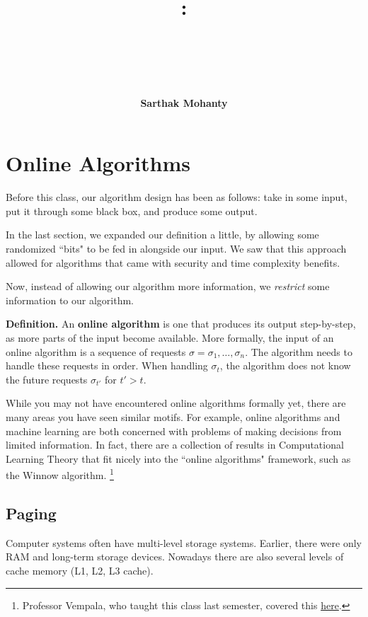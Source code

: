 \documentclass[14pt]{extreport}
\title{
    \vspace{1.75in}
    \textbf{\lectClass:\\ \lectTitle}\\
    \vspace{0.1in}\large{\textit{\lectClassInstructor\ \lectSection}}
    \vspace{2in}
\author{\textbf{Sarthak Mohanty}}
    \date{}
}
\begin{document}
\maketitle
\pagebreak

\chapter*{Online Algorithms}
    Before this class, our algorithm design has been as follows: take in some input, put it through some black box, and produce some output.

    \vspace{2mm}
    In the last section, we expanded our definition a little, by allowing some randomized ``bits" to be fed in alongside our input. We saw that this approach allowed for algorithms that came with security and time complexity benefits.

    \vspace{2mm}
    Now, instead of allowing our algorithm more information, we \textit{restrict} some information to our algorithm.
    
    \begin{tcolorbox}[colframe=gray!50, sharp corners]
        \textbf{Definition. } An \textbf{online algorithm} is one that produces its output step-by-step, as more parts of the input become available. More formally, the input of an online algorithm is a sequence of requests $\sigma = \sigma_{1}, \dots, \sigma_{n}$. The algorithm needs to handle these requests in order. When handling $\sigma_{t}$, the algorithm does not know the future requests $\sigma_{t'}$ for $t' > t$.
    \end{tcolorbox}

    \vspace{2mm}
    While you may not have encountered online algorithms formally yet, there are many areas you have seen similar motifs. For example, online algorithms and machine learning are both concerned with problems of making decisions from limited information. In fact, there are a collection of results in Computational Learning Theory that fit nicely into the ``online algorithms" framework, such as the Winnow algorithm. \footnote{Professor Vempala, who taught this class last semester, covered this \href{https://santoshv.github.io/2023CS4540/AI_theory2023.html}{here}.}
        

\section*{Paging}
    Computer systems often have multi-level storage systems. Earlier, there were only RAM and long-term storage devices. Nowadays there are also several levels of cache memory (L1, L2, L3 cache).
    
\end{document}

